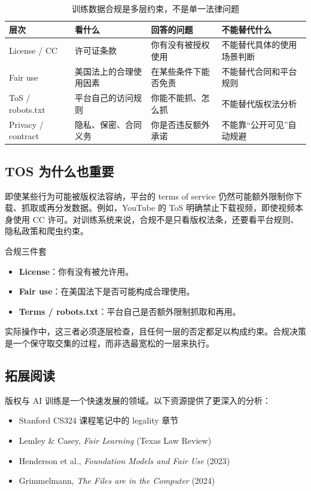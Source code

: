 \documentclass[a4paper]{article}
\begin{document}
\begin{table}[H]
\centering
\begin{tabular}{p{}p{}p{}p{}}
\toprule
\textbf{层次} & \textbf{看什么} & \textbf{回答的问题} & \textbf{不能替代什么} \\
\midrule
License / CC & 许可证条款 & 你有没有被授权使用 & 不能替代具体的使用场景判断 \\
Fair use & 美国法上的合理使用因素 & 在某些条件下能否免责 & 不能替代合同和平台规则 \\
ToS / robots.txt & 平台自己的访问规则 & 你能不能抓、怎么抓 & 不能替代版权法分析 \\
Privacy / contract & 隐私、保密、合同义务 & 你是否违反额外承诺 & 不能靠“公开可见”自动规避 \\
\bottomrule
\end{tabular}
\caption{训练数据合规是多层约束，不是单一法律问题}
\end{table}

\subsection{TOS 为什么也重要}

即使某些行为可能被版权法容纳，平台的 terms of service 仍然可能额外限制你下载、抓取或再分发数据。例如，YouTube 的 ToS 明确禁止下载视频，即使视频本身使用 CC 许可。对训练系统来说，合规不是只看版权法条，还要看平台规则、隐私政策和爬虫约束。

\begin{knowledgebox}{合规三件套}
\begin{itemize}
    \item \textbf{License}：你有没有被允许用。
    \item \textbf{Fair use}：在美国法下是否可能构成合理使用。
    \item \textbf{Terms / robots.txt}：平台自己是否额外限制抓取和再用。
\end{itemize}
实际操作中，这三者必须逐层检查，且任何一层的否定都足以构成约束。合规决策是一个保守取交集的过程，而非选最宽松的一层来执行。
\end{knowledgebox}

\subsection{拓展阅读}

版权与 AI 训练是一个快速发展的领域。以下资源提供了更深入的分析：
\begin{itemize}
    \item Stanford CS324 课程笔记中的 legality 章节
    \item Lemley \& Casey, \textit{Fair Learning} (Texas Law Review)
    \item Henderson et al., \textit{Foundation Models and Fair Use} (2023)
    \item Grimmelmann, \textit{The Files are in the Computer} (2024)
\end{itemize}
\end{document}
